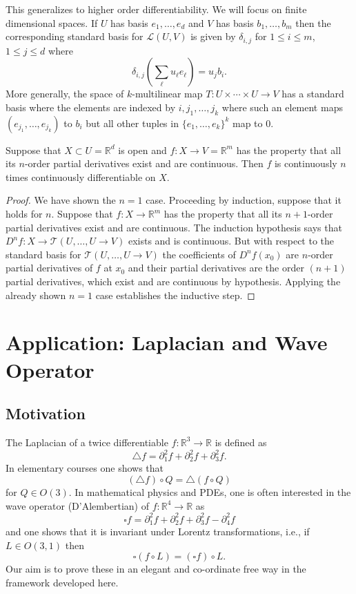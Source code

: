 \documentclass[twoside, a4paper, 10pt]{amsart}
\begin{document}
This generalizes to higher order differentiability. We will focus on finite dimensional spaces. If $U$ has basis $e_1, \ldots, e_d$ and $V$ has basis $b_1, \ldots, b_m$ then the corresponding standard basis for $\mathcal{L}(U,V)$ is given by $\delta_{i,j}$ for $1 \leq i \leq m$, $1 \leq j \leq d$ where $$\delta_{i,j}\left( \sum_{\ell} u_{\ell} e_{\ell} \right) = u_j b_i.$$ More generally, the space of $k$-multilinear map $T:U \times \cdots \times U \to V$ has a standard basis where the elements are indexed by $i, j_1, \ldots, j_k$ where such an element maps  $(e_{j_1}, \ldots, e_{j_k})$ to $b_i$ but all other tuples in $\{e_1, \ldots, e_k\}^k$ map to $0$.

\begin{thm}  Suppose that $X \subset U = \mathbb{R}^d$ is open and $f:X \to V = \mathbb{R}^m$ has the property that all its $n$-order partial derivatives exist and are continuous. Then $f$ is continuously $n$ times continuously differentiable on $X$. \end{thm} 

\begin{proof} We have shown the $n=1$ case. Proceeding by induction, suppose that it holds for $n$. Suppose that $f:X \to \mathbb{R}^m$ has the property that all its $n+1$-order partial derivatives exist and are continuous. The induction hypothesis says that $D^nf: X \to \mathcal{T}( U, \ldots, U \to V)$ exists and is continuous. But with respect to the standard basis for $\mathcal{T}( U, \ldots, U \to V)$ the coefficients of $D^nf(x_0)$ are $n$-order partial derivatives of $f$ at $x_0$ and their partial derivatives are the order $(n+1)$ partial derivatives, which exist and are continuous by hypothesis. Applying the already shown $n=1$ case establishes the inductive step. \end{proof}

\section{Application: Laplacian and Wave Operator}

\subsection{Motivation}

The Laplacian of a twice differentiable $f:\mathbb{R}^3 \to \mathbb{R}$ is defined as $$\triangle f = \partial_{1}^2f + \partial_{2}^2f  + \partial_{3}^2f. $$ In elementary courses one shows that $$(\triangle f) \circ Q = \triangle (f \circ Q)$$ for $Q \in O(3)$. In mathematical physics and PDEs, one is often interested in the wave operator (D'Alembertian) of $f:\mathbb{R}^4 \to \mathbb{R}$ as $$ \square f = \partial_{1}^2f + \partial_{2}^2f  + \partial_{3}^2f  - \partial_{4}^2f  $$ and one shows that it is invariant under Lorentz transformations, i.e., if $L \in O(3,1)$ then $$\square(f \circ L) = (\square f) \circ L.$$ Our aim is to prove these in an elegant and co-ordinate free way in the framework developed here.
\end{document}
